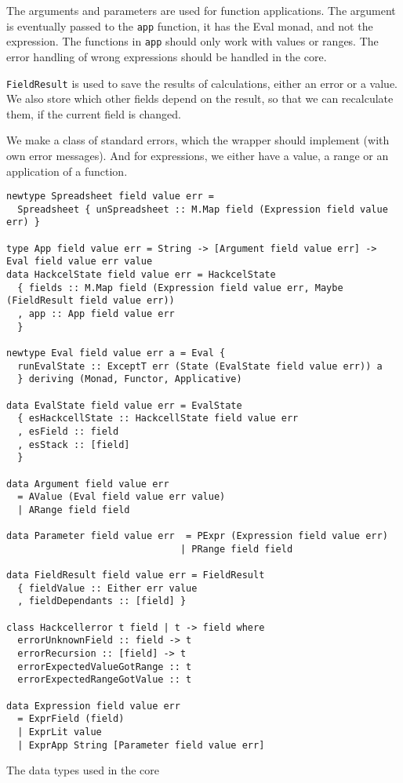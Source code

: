 \documentclass{article}
\begin{document}
	The arguments and parameters are used for function applications. The argument is eventually passed to the \texttt{app} function, it has the Eval monad, and not the expression. The functions in \texttt{app} should only work with values or ranges. The error handling of wrong expressions should be handled in the core.
	
	\texttt{FieldResult} is used to save the results of calculations, either an error or a value. We also store which other fields depend on the result, so that we can recalculate them, if the current field is changed.
	
	We make a class of standard errors, which the wrapper should implement (with own error messages). And for expressions, we either have a value, a range or an application of a function.
	
	\begin{listing}
	\begin{verbatim}
newtype Spreadsheet field value err =
  Spreadsheet { unSpreadsheet :: M.Map field (Expression field value err) }
     
type App field value err = String -> [Argument field value err] -> Eval field value err value
data HackcelState field value err = HackcelState
  { fields :: M.Map field (Expression field value err, Maybe (FieldResult field value err))
  , app :: App field value err
  }

newtype Eval field value err a = Eval {
  runEvalState :: ExceptT err (State (EvalState field value err)) a
  } deriving (Monad, Functor, Applicative)

data EvalState field value err = EvalState
  { esHackcellState :: HackcellState field value err
  , esField :: field
  , esStack :: [field]
  }

data Argument field value err
  = AValue (Eval field value err value)
  | ARange field field

data Parameter field value err  = PExpr (Expression field value err)
                               | PRange field field
                               
data FieldResult field value err = FieldResult
  { fieldValue :: Either err value
  , fieldDependants :: [field] }

class Hackcellerror t field | t -> field where
  errorUnknownField :: field -> t
  errorRecursion :: [field] -> t
  errorExpectedValueGotRange :: t
  errorExpectedRangeGotValue :: t

data Expression field value err
  = ExprField (field)
  | ExprLit value
  | ExprApp String [Parameter field value err]
	\end{verbatim}
	\caption{The data types used in the core}
	\label{listing:datatypes}
	\end{listing}
\end{document}
